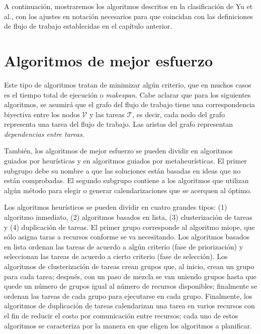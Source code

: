 A continuación, mostraremos los algoritmos descritos en la clasificación de Yu et al., con los ajustes en notación necesarios para que coincidan con las definiciones de flujo de trabajo establecidas en el capítulo anterior.

\section{Algoritmos de mejor esfuerzo}
Este tipo de algoritmos tratan de minimizar algún criterio, que en muchos casos es el tiempo total de ejecución o \emph{makespan}. Cabe aclarar que para los siguientes algoritmos, se asumirá que el grafo del flujo de trabajo tiene una correspondencia biyectiva entre los nodos $\mathcal{V}$ y las tareas $\mathcal{T}$, es decir, cada nodo del grafo representa una tarea del flujo de trabajo. Las aristas del grafo representan \emph{dependencias entre tareas}.

También, los algoritmos de mejor esfuerzo se pueden dividir en algoritmos guiados por heurísticas y en algoritmos guiados por metaheurísticas. El primer subgrupo debe su nombre a que las soluciones están basadas en ideas que no están comprobadas. El segundo subgrupo contiene a los algoritmos que utilizan algún método para elegir o generar calendarizaciones que se acerquen al óptimo.

Los algoritmos heurísticos se pueden dividir en cuatro grandes tipos: (1) algoritmo inmediato, (2) algoritmos basados en lista, (3) clusterización de tareas y (4) duplicación de tareas. El primer grupo corresponde al algoritmo miope, que sólo asigna taras a recursos conforme se va necesitando. Los algoritmos basados en lista ordenan las tareas de acuerdo a algún criterio (fase de priorización) y seleccionan las tareas de acuerdo a cierto criterio (fase de selección). Los algoritmos de clusterización de tareas crean grupos que, al inicio, crean un grupo para cada tarea; después, con un paso de mezcla se van uniendo grupos hasta que quede un número de grupos igual al número de recursos disponibles; finalmente se ordenan las tareas de cada grupo para ejecutarse en cada grupo. Finalmente, los algoritmos de duplicación de tareas calendarizan una tarea en varios recursos con el fin de reducir el costo por comunicación entre recursos; cada uno de estos algoritmos se caracteriza por la manera en que eligen los algoritmos a planificar.

